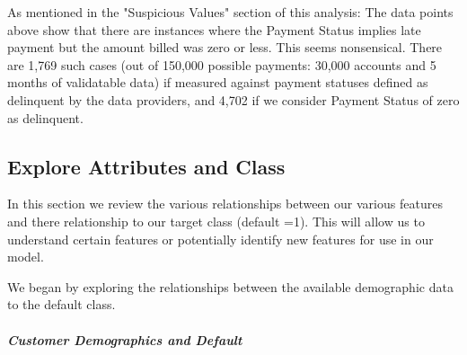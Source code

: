 \documentclass[11pt]{article}
\begin{document}
    As mentioned in the "Suspicious Values" section of this analysis: The
data points above show that there are instances where the Payment Status
implies late payment but the amount billed was zero or less. This seems
nonsensical. There are 1,769 such cases (out of 150,000 possible
payments: 30,000 accounts and 5 months of validatable data) if measured
against payment statuses defined as delinquent by the data providers,
and 4,702 if we consider Payment Status of zero as delinquent.

    \subsection{Explore Attributes and
Class}\label{explore-attributes-and-class}

In this section we review the various relationships between our various
features and there relationship to our target class (default =1). This
will allow us to understand certain features or potentially identify new
features for use in our model.

We began by exploring the relationships between the available
demographic data to the default class.

    \subparagraph{\texorpdfstring{\emph{Customer Demographics and
Default}}{Customer Demographics and Default}}\label{customer-demographics-and-default}
\end{document}
